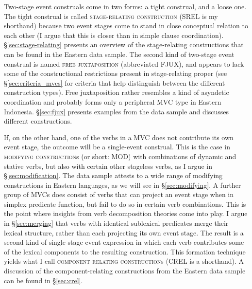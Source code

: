 Two-stage event construals come in two forms: a tight construal, and a loose one. The tight construal is called \textsc{stage-relating construction} (SREL is my shorthand) because two event stages come to stand in close conceptual relation to each other (I argue that this is closer than in simple clause coordination). §\ref{sec:stage-relating} presents an overview of the stage-relating constructions that can be found in the Eastern  data sample. The second kind of two-stage event construal is named \textsc{free juxtaposition} (abbreviated FJUX), and appears to lack some of the constructional restrictions present in stage-relating proper (see §\ref{sec:criteria_mvcs} for criteria that help distinguish between the different construction types). Free juxtaposition rather resembles a kind of asyndetic coordination and probably forms only a peripheral MVC type in Eastern Indonesia. §\ref{sec:fjux} presents examples from the data sample and discusses different constructions.

If, on the other hand, one of the verbs in a MVC does not contribute its own event stage, the outcome will be a single-event construal. This is the case in \textsc{modifying construction}s (or short: MOD) with combinations of dynamic and stative verbs, but also with certain other stageless verbs, as I argue in §\ref{sec:modification}. The data sample attests to a wide range of modifying constructions in Eastern  languages, as we will see in §\ref{sec:modifying}. A further group of MVCs does consist of verbs that can project an event stage when in simplex predicate function, but fail to do so in certain verb combinations. This is the point where insights from verb decomposition theories come into play. I argue in §\ref{sec:merging} that verbs with identical sublexical predicates merge their lexical structure, rather than each projecting its own event stage. The result is a second kind of single-stage event expression in which each verb contributes some of the lexical components to the resulting construction. This formation technique yields what I call \textsc{component-relating construction}s (CREL is a shorthand). A discussion of the component-relating constructions from the Eastern  data sample can be found in §\ref{sec:crel}.

